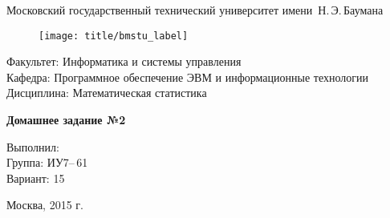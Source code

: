 
\thispagestyle{empty}

\begin{center}
    \Large
    Московский государственный технический университет имени~Н.\,Э.\,Баумана
\end{center}

\begin{figure}[h!]
    \begin{center}
        \texttt{[image: title/bmstu\_label]}
    \end{center}
\end{figure}

{\large
\noindent
Факультет: Информатика и системы управления\\[2mm]
\noindent
Кафедра: Программное обеспечение ЭВМ и информационные технологии\\[2mm]
\noindent
Дисциплина: Математическая статистика
\vspace{1.5cm}}

\begin{center}
    \Large
    \textbf{Домашнее задание №2} \\
\end{center}
\vfill

\hfill\begin{minipage}{0.35\textwidth}
    Выполнил: \\
    Группа: ИУ7--\,61\\
    Вариант: 15
\end{minipage}
\vfill

\begin{center}
    Москва, 2015 г.
\end{center}